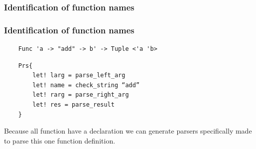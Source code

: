 \subsubsection{Identification of function names}

\begin{frame}[fragile]
    \frametitle{Identification of function names}
    
    \begin{lstlisting}
    Func 'a -> "add" -> b' -> Tuple <'a 'b>
    \end{lstlisting}

    \begin{lstlisting}
    Prs{
        let! larg = parse_left_arg
        let! name = check_string “add”
        let! rarg = parse_right_arg
        let! res = parse_result
    }
    \end{lstlisting}

    Because all function have a declaration we can generate parsers specifically made to parse this one function definition. 

\end{frame}

